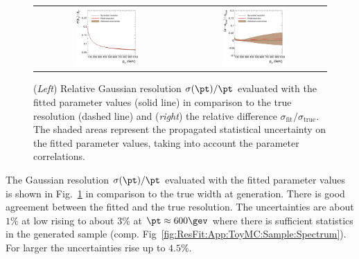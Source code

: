 \begin{figure}[ht]
  \centering
  \begin{tabular}{cc}
    \includegraphics[width=0.45\textwidth]{figures/resFit_ToyMC_PtGenCuts_Sigma} &
    \includegraphics[width=0.45\textwidth]{figures/resFit_ToyMC_PtGenCuts_SigmaRelDifference} \\
  \end{tabular}
  \caption{(\textit{Left}) Relative Gaussian resolution $\sigma(\pt)/\pt$ evaluated with the fitted
    parameter values (solid line) in comparison to the true resolution
    (dashed line) and (\textit{right}) the relative difference
    $\sigma_{\text{fit}} / \sigma_{\text{true}}$.
    The shaded areas represent the propagated statistical
    uncertainty on the fitted parameter values, taking into account the
    parameter correlations.}
  \label{fig:ResFit:App:ToyMC:PtGenCuts:FittedSigma}
\end{figure}

The Gaussian resolution $\sigma(\pt)/\pt$ evaluated with the fitted
parameter values is shown in Fig.~\ref{fig:ResFit:App:ToyMC:PtGenCuts:FittedSigma}
in comparison to the true width at generation.
There is good agreement between the fitted and the true resolution.
The uncertainties are about $1\%$ at low \pt rising to
about $3\%$ at $\pt \approx 600\gev$ where there is sufficient statistics in
the generated sample (comp. Fig~\ref{fig:ResFit:App:ToyMC:Sample:Spectrum}).
For larger \pt the uncertainties rise up to $4.5\%$.

